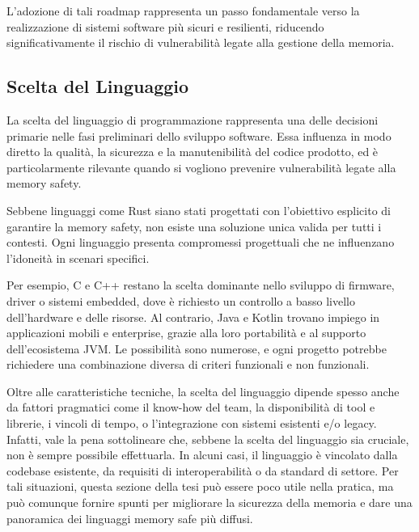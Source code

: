 L'adozione di tali roadmap rappresenta un passo fondamentale verso la
realizzazione di sistemi software più sicuri e resilienti, riducendo significativamente
il rischio di vulnerabilità legate alla gestione della memoria.

\subsection{Scelta del Linguaggio}
\label{sec:linguaggio}

La scelta del linguaggio di programmazione rappresenta una delle decisioni
primarie nelle fasi preliminari dello sviluppo software. Essa influenza in modo diretto
la qualità, la sicurezza e la manutenibilità del codice prodotto, ed è particolarmente
rilevante quando si vogliono prevenire vulnerabilità legate alla memory safety.

Sebbene linguaggi come Rust siano stati progettati con l'obiettivo esplicito di garantire
la memory safety, non esiste una soluzione unica valida per tutti i contesti. Ogni
linguaggio presenta compromessi progettuali che ne influenzano l'idoneità in scenari
specifici.

Per esempio, C e C++ restano la scelta dominante nello sviluppo di firmware, driver
o sistemi embedded, dove è richiesto un controllo a basso livello dell'hardware
e delle risorse. Al contrario, Java e Kotlin trovano impiego in applicazioni
mobili e enterprise, grazie alla loro portabilità e al supporto dell'ecosistema JVM.
Le possibilità sono numerose, e ogni progetto potrebbe richiedere una combinazione
diversa di criteri funzionali e non funzionali.

Oltre alle caratteristiche tecniche, la scelta del linguaggio dipende spesso
anche da fattori pragmatici come il know-how del team, la disponibilità di tool e
librerie, i vincoli di tempo, o l'integrazione con sistemi esistenti e/o legacy.
Infatti, vale la pena sottolineare che, sebbene la scelta del linguaggio sia
cruciale, non è sempre possibile effettuarla. In alcuni casi, il linguaggio è vincolato
dalla codebase esistente, da requisiti di interoperabilità o da standard di
settore. Per tali situazioni, questa sezione della tesi può essere poco utile
nella pratica, ma può comunque fornire spunti per migliorare la sicurezza della memoria
e dare una panoramica dei linguaggi memory safe più diffusi.

